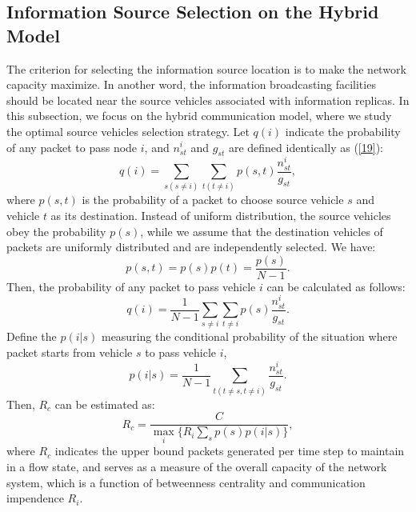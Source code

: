\documentclass[journal,12pt,draftclsnofoot,onecolumn]{IEEEtran}
\begin{document}
\subsection{Information Source Selection on the Hybrid Model}
\label{Information Source Selection on the Hybrid Model}
The criterion for selecting the information source location is to make the network capacity maximize. In another word, the information broadcasting facilities should be located near the source vehicles associated with information replicas. In this subsection, we focus on the hybrid communication model, where we study the optimal source vehicles selection strategy.
Let $q(i)$ indicate the probability of any packet to pass node $i$, and $n_{st}^{i}$ and ${g}_{st}$ are defined identically as (\ref{19}):
\begin{equation}\label{32}
q(i)=\sum\limits_{s(s\ne i)}{\sum\limits_{t(t\ne i)}{p(s,t)\frac{n_{st}^{i}}{{{g}_{st}}}}},
\end{equation}
where $p(s,t)$ is the probability of a packet to choose source vehicle $s$ and vehicle $t$ as its destination.
Instead of uniform distribution, the source vehicles obey the probability $p(s)$, while we assume that the destination vehicles of packets are uniformly distributed and are independently selected. We have:
\begin{equation}\label{34}
p(s,t)=p(s)p(t)=\frac{p(s)}{N-1}.
\end{equation}
Then, the probability of any packet to pass vehicle $i$ can be calculated as follows:
\begin{equation}\label{35}
 q(i)=\frac{1}{N-1}\sum\limits_{s\ne i}{\sum\limits_{t\ne i}{p(s)\frac{n_{st}^{i}}{{{g}_{st}}}}}.
\end{equation}
Define the $p(i|s)$ measuring the conditional probability of the situation where packet starts from vehicle $s$ to pass vehicle $i$,
\begin{equation}\label{36}
p(i|s)=\frac{1}{N-1}\sum\limits_{t(t\ne s, t\ne i)}{\frac{n_{st}^{i}}{{{g}_{st}}}}.
\end{equation}
Then, $R_{c}$ can be estimated as:
\begin{equation}\label{37}
  {{R}_{c}}=\frac{C}{{{\max }_{i}}\{{{R}_{i}}\sum\nolimits_{s}{p(s)p(i|s)}\}},
\end{equation}
where $R_{c}$ indicates the upper bound packets generated per time step to maintain in a flow state, and serves as a measure of the overall capacity of the network system, which is a function of betweenness centrality and communication impendence $R_{i}$.
\end{document}
